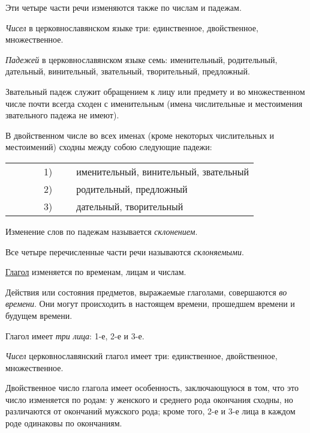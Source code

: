 \documentclass[11pt,a4paper,oneside]{memoir}
\begin{document}
    Эти четыре части речи изменяются также по числам и падежам.

    \emph{Чисел} в церковнославянском языке три: единственное, двойственное, множественное.
    
    \emph{Падежей} в церковнославянском языке семь: именительный, родительный, дательный, винительный, звательный, творительный, предложный.
    
    Звательный падеж служит обращением к лицу или предмету и во множественном числе почти всегда сходен с именительным (имена числительные и местоимения звательного падежа не имеют).
    
    В двойственном числе во всех именах (кроме некоторых числительных и местоимений) сходны между собою следующие падежи:
    
    \begin{flushleft}
        \renewcommand*{\arraystretch}{1.2}
        \begin{tabular}[l]{clcl}
            
            ~~~~~ & 1) & ~ & именительный, винительный, звательный\\
            ~~~~~ & 2) & ~ & родительный, предложный\\
            ~~~~~ & 3) & ~ & дательный, творительный\\
            
        \end{tabular}
    \end{flushleft}

    Изменение слов по падежам называется \emph{склонением}.
    
    Все четыре перечисленные части речи называются \emph{склоняемыми}.
    
    \underline{Глагол} изменяется по временам, лицам и числам.
    
    Действия или состояния предметов, выражаемые глаголами, совершаются \emph{во времени}. Они могут происходить в настоящем времени, прошедшем времени и будущем времени.
    
    Глагол имеет \emph{три лица}: 1-е, 2-е и 3-е.
    
    \emph{Чисел} церковнославянский глагол имеет три: единственное, двойственное, множественное.
    
    Двойственное число глагола имеет особенность, заключающуюся в том, что это число изменяется по родам: у женского и среднего рода окончания сходны, но различаются от окончаний мужского рода; кроме того, 2-е и 3-е лица в каждом роде одинаковы по окончаниям.
    
\end{document}
